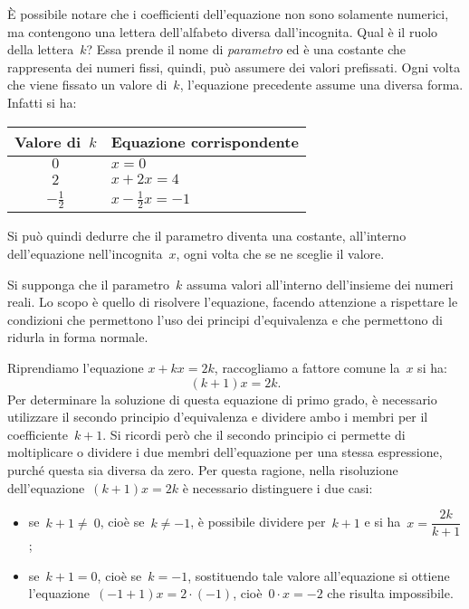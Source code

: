 È possibile notare che i coefficienti dell'equazione non sono solamente numerici, ma contengono una lettera dell'alfabeto diversa
dall'incognita. Qual è il ruolo della lettera~$k$?
Essa prende il nome di \emph{parametro} ed è una costante che rappresenta dei numeri fissi, quindi, può assumere dei valori prefissati.
Ogni volta che viene fissato un valore di~$k$, l'equazione precedente assume una diversa forma. Infatti si ha:
\begin{center}
\begin{tabular}{cl}
\toprule
Valore di~$k$ & Equazione corrispondente\\
\midrule
$0$ & $x=0$\\
$2$ & $x+2x=4$\\
$-\frac{1}{2}$ & $x-\frac{1}{2}x=-1$\\
\bottomrule
\end{tabular}
\end{center}

Si può quindi dedurre che il parametro diventa una costante, all'interno dell'equazione nell'incognita~$x$, ogni volta che se ne sceglie il valore.

Si supponga che il parametro~$k$ assuma valori all'interno dell'insieme dei numeri reali. Lo scopo è quello di risolvere l'equazione,
facendo attenzione a rispettare le condizioni che permettono l'uso dei principi d'equivalenza e che permettono di ridurla in forma normale.

Riprendiamo l'equazione  $x+kx=2k$, raccogliamo a fattore comune la~$x$ si ha:
\begin{equation*}
 (k+1)x=2k.
\end{equation*}
Per determinare la soluzione di questa equazione di primo grado, è necessario utilizzare il secondo principio d'equivalenza e
dividere ambo i membri per il coefficiente~$k+1$.
Si ricordi però che il secondo principio ci permette di moltiplicare o dividere i due membri dell'equazione per una stessa espressione,
purché questa sia diversa da zero.
Per questa ragione, nella risoluzione dell'equazione~$(k+1)x=2k$ è necessario distinguere i due casi:
\begin{itemize}
\item se~$k+1\neq~0$, cioè se~$k\neq -1$, è possibile dividere per~$k+1$ e si ha~$x=\dfrac{2k}{k+1}$;
\item se~$k+1=0$, cioè se~$k=-1$, sostituendo tale valore all'equazione si ottiene l'equazione~$(-1+1)x=2\cdot (-1)$,
   cioè~$0\cdot x=-2$ che risulta impossibile.
\end{itemize}


